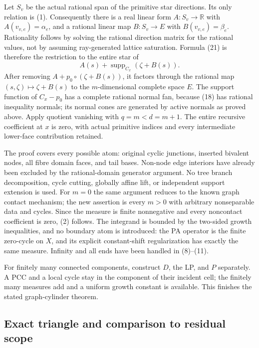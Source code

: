 \documentclass[
  11pt,
]{article}
\begin{document}
Let \(S_v\) be the actual rational span of the primitive star
directions. Its only relation is (1). Consequently there is a real
linear form \(A:S_v\to\mathbb{R}\) with \(A(v_{v,e})=\alpha_e\), and a
rational linear map \(B:S_v\to E\) with \(B(v_{v,e})=\beta_e\).
Rationality follows by solving the rational direction matrix for the
rational values, not by assuming ray-generated lattice saturation.
Formula (21) is therefore the restriction to the entire star of \[
                       A(s)+\operatorname{supp}_{C_x}(\zeta+B(s)).        \tag{26}
\] After removing \(A+p_0\circ(\zeta+B(s))\), it factors through the
rational map \((s,\zeta)\mapsto\zeta+B(s)\) to the \(m\)-dimensional
complete space \(E\). The support function of \(C_x-p_0\) has a complete
rational normal fan, because (18) has rational inequality normals; its
normal cones are generated by active normals as proved above. Apply
quotient vanishing with \(q=m<d=m+1\). The entire recursive coefficient
at \(x\) is zero, with actual primitive indices and every intermediate
lower-face contribution retained.

The proof covers every possible atom: original cyclic junctions,
inserted bivalent nodes, all fibre domain faces, and tail bases.
Non-node edge interiors have already been excluded by the
rational-domain generator argument. No tree branch decomposition, cycle
cutting, globally affine lift, or independent support extension is used.
For \(m=0\) the same argument reduces to the known graph contact
mechanism; the new assertion is every \(m>0\) with arbitrary
nonseparable data and cycles. Since the measure is finite nonnegative
and every noncontact coefficient is zero, (2) follows. The integrand is
bounded by the two-sided growth inequalities, and no boundary atom is
introduced: the PA operator is the finite zero-cycle on \(X\), and its
explicit constant-shift regularization has exactly the same measure.
Infinity and all ends have been handled in (8)--(11).

For finitely many connected components, construct \(D\), the LP, and
\(P\) separately. A PCC and a local cycle stay in the component of their
incident cell; the finitely many measures add and a uniform growth
constant is available. This finishes the stated graph-cylinder theorem.

\subsection{Exact triangle and comparison to residual
scope}\label{exact-triangle-and-comparison-to-residual-scope}
\end{document}
